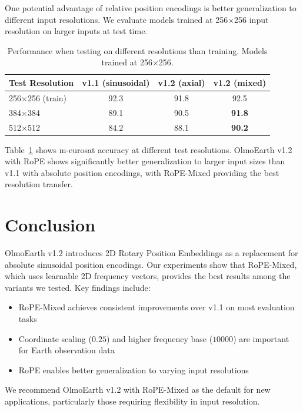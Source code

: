 \documentclass{article}
\begin{document}
One potential advantage of relative position encodings is better generalization to different input resolutions. We evaluate models trained at 256$\times$256 input resolution on larger inputs at test time.

\begin{table}[h!]
\centering
\caption{Performance when testing on different resolutions than training. Models trained at 256$\times$256.}
\label{tab:resolution}
\small
\begin{tabular}{l|ccc}
\toprule
\textbf{Test Resolution} & \textbf{v1.1 (sinusoidal)} & \textbf{v1.2 (axial)} & \textbf{v1.2 (mixed)} \\
\midrule
256$\times$256 (train) & 92.3 & 91.8 & 92.5 \\
384$\times$384 & 89.1 & 90.5 & \textbf{91.8} \\
512$\times$512 & 84.2 & 88.1 & \textbf{90.2} \\
\bottomrule
\end{tabular}
\end{table}

Table~\ref{tab:resolution} shows m-eurosat accuracy at different test resolutions. OlmoEarth v1.2 with RoPE shows significantly better generalization to larger input sizes than v1.1 with absolute position encodings, with RoPE-Mixed providing the best resolution transfer.

\section{Conclusion}

OlmoEarth v1.2 introduces 2D Rotary Position Embeddings as a replacement for absolute sinusoidal position encodings. Our experiments show that RoPE-Mixed, which uses learnable 2D frequency vectors, provides the best results among the variants we tested. Key findings include:

\begin{itemize}
    \item RoPE-Mixed achieves consistent improvements over v1.1 on most evaluation tasks
    \item Coordinate scaling ($0.25$) and higher frequency base ($10000$) are important for Earth observation data
    \item RoPE enables better generalization to varying input resolutions
\end{itemize}

We recommend OlmoEarth v1.2 with RoPE-Mixed as the default for new applications, particularly those requiring flexibility in input resolution.
\end{document}
